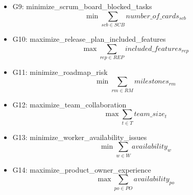 \documentclass{article}
\begin{document}
\begin{itemize}
\begin{equation*}
        \end{equation*}
    \item G9: minimize\_scrum\_board\_blocked\_tasks
        \begin{equation*}
            \min \sum_{scb \in SCB} number\_of\_cards_{scb}
        \end{equation*}
    \item G10: maximize\_release\_plan\_included\_features
        \begin{equation*}
            \max \sum_{rep \in REP} included\_features_{rep}
        \end{equation*}
    \item G11: minimize\_roadmap\_risk
        \begin{equation*}
            \min \sum_{rm \in RM} milestones_{rm}
        \end{equation*}
    \item G12: maximize\_team\_collaboration
        \begin{equation*}
            \max \sum_{t \in T} team\_size_{t}
        \end{equation*}
    \item G13: minimize\_worker\_availability\_issues
        \begin{equation*}
            \min \sum_{w \in W} availability_{w}
        \end{equation*}
    \item G14: maximize\_product\_owner\_experience
        \begin{equation*}
            \max \sum_{po \in PO} availability_{po}
        \end{equation*}
\end{itemize}
\end{document}
